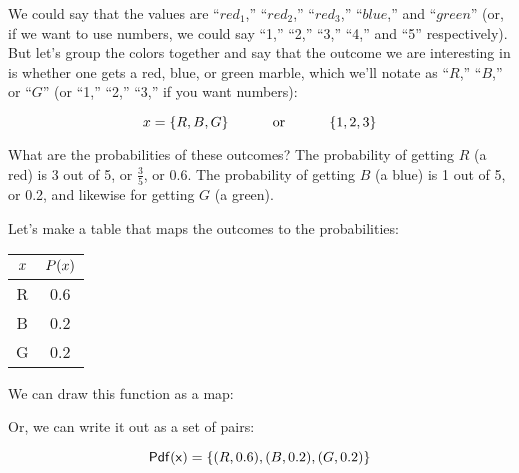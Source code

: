 \documentclass[../../../main.tex]{subfiles}
\begin{document}
\noindent
We could say that the values are ``$red_{1}$,'' ``$red_{2}$,'' ``$red_{3}$,'' ``$blue$,'' and ``$green$'' (or, if we want to use numbers, we could say ``1,'' ``2,'' ``3,'' ``4,'' and ``5'' respectively). But let's group the colors together and say that the outcome we are interesting in is whether one gets a red, blue, or green marble, which we'll notate as ``$R$,'' ``$B$,'' or ``$G$'' (or ``1,'' ``2,'' ``3,'' if you want numbers):

\begin{equation*}
    \RandVarVal/ = \{ R, B, G \} \hskip 1cm \text{ or } \hskip 1cm \{ 1, 2, 3 \}
\end{equation*}

\noindent
What are the probabilities of these outcomes? The probability of getting $R$ (a red) is 3 out of 5, or $\frac{3}{5}$, or 0.6. The probability of getting $B$ (a blue) is 1 out of 5, or 0.2, and likewise for getting $G$ (a green). 

Let's make a table that maps the outcomes to the probabilities:

\begin{center}
  \begin{tabular}{| c | c |}
    \hline
  $\RandVarVal/$ & $\Probability{\RandVarVal/}$ \\ \hline
               R & 0.6 \\ \hline
               B & 0.2 \\ \hline
               G & 0.2 \\ \hline
  \end{tabular}
\end{center}

\noindent
We can draw this function as a map:

\begin{center}\end{center}

\noindent
Or, we can write it out as a set of pairs:

\begin{equation*}
    \Pdf{\RandVarVal/} = \{ (R, 0.6), (B, 0.2), (G, 0.2) \}
\end{equation*}
\end{document}

